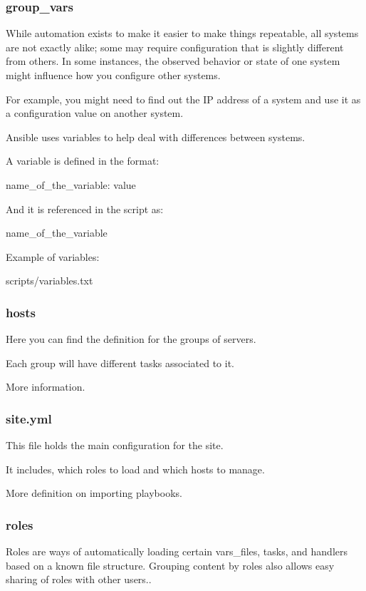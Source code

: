 \documentclass[12pt,landscape]{beamer}
\begin{document}
\begin{frame}[allowframebreaks]
  \frametitle{group\_vars}

While automation exists to make it easier to make things repeatable, all systems are not exactly alike; some may require configuration that is slightly different from others. In some instances, the observed behavior or state of one system might influence how you configure other systems. 

For example, you might need to find out the IP address of a system and use it as a configuration value on another system.

Ansible uses variables to help deal with differences between systems\cite{variables_ansible}.

A variable is defined in the format: 

name\_of\_the\_variable: value

And it is referenced in the script as:

{{ name\_of\_the\_variable }}
\bigskip

Example of variables:
  
{scripts/variables.txt}

\end{frame}

\begin{frame}
  \frametitle{hosts}

Here you can find the definition for the groups of servers. 

Each group will have different tasks associated to it.



More information\cite{inventory_ansible}. 

\end{frame}

\begin{frame}
  \frametitle{site.yml}

This file holds the main configuration for the site.

It includes, which roles to load and which hosts to manage.

More definition on importing playbooks\cite{import_playbook}.

\end{frame}

\begin{frame}
  \frametitle{roles}

Roles are ways of automatically loading certain vars\_files, tasks, and handlers based on a known file structure. 
Grouping content by roles also allows easy sharing of roles with other users.\cite{import_playbook}.



\end{frame}
\end{document}
